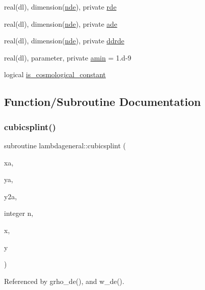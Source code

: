 \begin{DoxyCompactItemize}
real(dl), dimension(\mbox{\hyperlink{namespacelambdageneral_ae21da0c8fff86159b789dee9579bd7d5}{nde}}), private \mbox{\hyperlink{namespacelambdageneral_addbcd4776d6d01e9839013990b02fd91}{rde}}
\item 
real(dl), dimension(\mbox{\hyperlink{namespacelambdageneral_ae21da0c8fff86159b789dee9579bd7d5}{nde}}), private \mbox{\hyperlink{namespacelambdageneral_a3c9598fcf92daa2c3f6715e256e50c98}{ade}}
\item 
real(dl), dimension(\mbox{\hyperlink{namespacelambdageneral_ae21da0c8fff86159b789dee9579bd7d5}{nde}}), private \mbox{\hyperlink{namespacelambdageneral_a4076e8b34d8ff5774ed58d456c862c14}{ddrde}}
\item 
real(dl), parameter, private \mbox{\hyperlink{namespacelambdageneral_a45e4f8d95a544fe1221e6ff186d9f4b9}{amin}} = 1.d-\/9
\item 
logical \mbox{\hyperlink{namespacelambdageneral_a8ac10c80c54ab03dde5512cfa1baf5d2}{is\+\_\+cosmological\+\_\+constant}}
\end{DoxyCompactItemize}


\subsection{Function/\+Subroutine Documentation}
\mbox{\label{namespacelambdageneral_ac223e519da99aef58a91fb3932b7c438}} 
\subsubsection{\texorpdfstring{cubicsplint()}{cubicsplint()}}
{\footnotesize\ttfamily subroutine lambdageneral\+::cubicsplint (\begin{DoxyParamCaption}\item[{}]{xa,  }\item[{}]{ya,  }\item[{}]{y2a,  }\item[{integer}]{n,  }\item[{}]{x,  }\item[{}]{y }\end{DoxyParamCaption})}



Referenced by grho\+\_\+de(), and w\+\_\+de().

